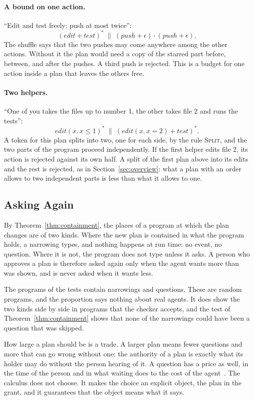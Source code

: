 \documentclass[acmsmall,nonacm,screen]{acmart}
\newcommand{\nm}[1]{\mathit{#1}}
\newcommand{\edit}{\nm{edit}}
\newcommand{\test}{\nm{test}}
\newcommand{\push}{\nm{push}}
\begin{document}
\paragraph{A bound on one action.} ``Edit and test freely; push at most twice'':
\[
(\edit + \test)^{*} \;\parallel\; (\push + \epsilon) \cdot (\push + \epsilon).
\]
The shuffle says that the two pushes may come anywhere among the other actions. Without it
the plan would need a copy of the starred part before, between, and after the pushes. A
third push is rejected. This is a budget for one action inside a plan that leaves the others
free.

\paragraph{Two helpers.} ``One of you takes the files up to number 1, the other takes file
2 and runs the tests'':
\[
\edit(x.\,x \le 1)^{*} \;\parallel\; (\edit(x.\,x = 2) + \test)^{*}.
\]
A token for this plan splits into two, one for each side, by the rule \textsc{Split}, and
the two parts of the program proceed independently. If the first helper edits file 2, its
action is rejected against its own half. A split of the first plan above into its edits and
the rest is rejected, as in Section~\ref{sec:overview}: what a plan with an order allows to
two independent parts is less than what it allows to one.

\subsection{Asking Again}

By Theorem~\ref{thm:containment}, the places of a program at which the plan changes are of
two kinds. Where the new plan is contained in what the program holds, a narrowing types, and
nothing happens at run time: no event, no question. Where it is not, the program does not
type unless it asks. A person who approves a plan is therefore asked again only when the
agent wants more than was shown, and is never asked when it wants less.

The \exPrograms{} programs of the tests contain \exNarrowings{} narrowings and
\exQuestions{} questions. These are random programs, and the proportion says nothing about
real agents. It does show the two kinds side by side in programs that the checker accepts,
and the test of Theorem~\ref{thm:containment} shows that none of the narrowings could have
been a question that was skipped.

How large a plan should be is a trade. A larger plan means fewer questions and more that can
go wrong without one: the authority of a plan is exactly what its holder may do without the
person hearing of it. A question has a price as well, in the time of the person and in what
waiting does to the cost of the agent~\citep{tpp6}. The calculus does not choose. It makes
the choice an explicit object, the plan in the grant, and it guarantees that the object means
what it says.
\end{document}

